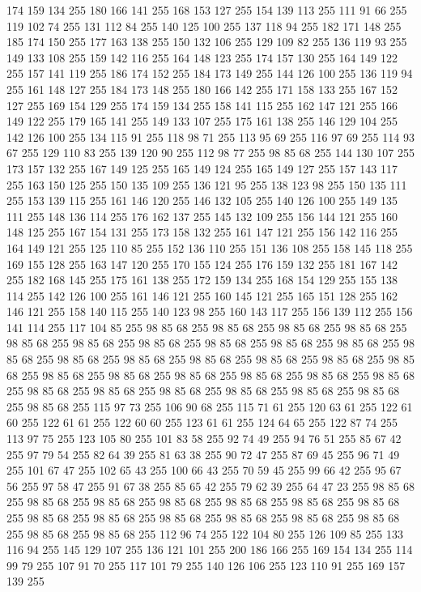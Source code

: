 174 159 134 255 180 166 141 255 168 153 127 255 154 139 113 255 111 91 66 255 119 102 74 255 131 112 84 255 140 125 100 255 137 118 94 255 182 171 148 255 185 174 150 255 177 163 138 255 150 132 106 255 129 109 82 255 136 119 93 255 149 133 108 255 159 142 116 255 164 148 123 255 174 157 130 255 164 149 122 255 157 141 119 255 186 174 152 255 184 173 149 255 144 126 100 255 136 119 94 255 161 148 127 255 184 173 148 255 180 166 142 255 171 158 133 255 167 152 127 255 169 154 129 255 174 159 134 255 158 141 115 255 162 147 121 255 166 149 122 255 179 165 141 255 149 133 107 255 175 161 138 255 146 129 104 255 142 126 100 255 134 115 91 255 118 98 71 255 113 95 69 255 116 97 69 255 114 93 67 255 129 110 83 255 139 120 90 255 112 98 77 255 98 85 68 255 144 130 107 255 173 157 132 255 167 149 125 255 165 149 124 255 165 149 127 255 157 143 117 255 163 150 125 255 150 135 109 255 136 121 95 255 138 123 98 255 150 135 111 255 153 139 115 255 161 146 120 255 146 132 105 255 140 126 100 255
149 135 111 255 148 136 114 255 176 162 137 255 145 132 109 255 156 144 121 255 160 148 125 255 167 154 131 255 173 158 132 255 161 147 121 255 156 142 116 255 164 149 121 255 125 110 85 255 152 136 110 255 151 136 108 255 158 145 118 255 169 155 128 255 163 147 120 255 170 155 124 255 176 159 132 255 181 167 142 255 182 168 145 255 175 161 138 255 172 159 134 255 168 154 129 255 155 138 114 255 142 126 100 255 161 146 121 255 160 145 121 255 165 151 128 255 162 146 121 255 158 140 115 255 140 123 98 255 160 143 117 255 156 139 112 255 156 141 114 255 117 104 85 255 98 85 68 255 98 85 68 255 98 85 68 255 98 85 68 255 98 85 68 255 98 85 68 255 98 85 68 255 98 85 68 255 98 85 68 255 98 85 68 255 98 85 68 255 98 85 68 255 98 85 68 255 98 85 68 255 98 85 68 255 98 85 68 255 98 85 68 255 98 85 68 255 98 85 68 255 98 85 68 255 98 85 68 255 98 85 68 255 98 85 68 255 98 85 68 255 98 85 68 255 98 85 68 255 98 85 68 255 98 85 68 255
98 85 68 255 98 85 68 255 115 97 73 255 106 90 68 255 115 71 61 255 120 63 61 255 122 61 60 255 122 61 61 255 122 60 60 255 123 61 61 255 124 64 65 255 122 87 74 255 113 97 75 255 123 105 80 255 101 83 58 255 92 74 49 255 94 76 51 255 85 67 42 255 97 79 54 255 82 64 39 255 81 63 38 255 90 72 47 255 87 69 45 255 96 71 49 255 101 67 47 255 102 65 43 255 100 66 43 255 70 59 45 255 99 66 42 255 95 67 56 255 97 58 47 255 91 67 38 255 85 65 42 255 79 62 39 255 64 47 23 255 98 85 68 255 98 85 68 255 98 85 68 255 98 85 68 255 98 85 68 255 98 85 68 255 98 85 68 255 98 85 68 255 98 85 68 255 98 85 68 255 98 85 68 255 98 85 68 255 98 85 68 255 98 85 68 255 98 85 68 255 112 96 74 255 122 104 80 255 126 109 85 255 133 116 94 255 145 129 107 255 136 121 101 255 200 186 166 255 169 154 134 255 114 99 79 255 107 91 70 255 117 101 79 255 140 126 106 255 123 110 91 255 169 157 139 255

